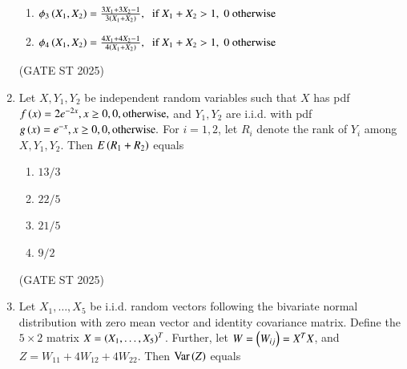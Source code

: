 \documentclass[journal,12pt,onecolumn]{IEEEtran}
\theoremstyle{remark}
\begin{document}
\begin{enumerate}
\begin{enumerate}
\item $\phi_3\left(X_1,X_2\right) = \frac{3X_1+3X_2-1}{3\left(X_1+X_2\right)}, \;\; \text{if } X_1+X_2>1, \; 0 \text{ otherwise}$
\item $\phi_4\left(X_1,X_2\right) = \frac{4X_1+4X_2-1}{4\left(X_1+X_2\right)}, \;\; \text{if } X_1+X_2>1, \; 0 \text{ otherwise}$
\end{enumerate}
\hfill{(GATE ST 2025)}
\item Let $X,Y_1,Y_2$ be independent random variables such that $X$ has pdf  
$
f\left(x\right) = 
2e^{-2x},  x \geq 0, \\
0,  \text{otherwise},
$
and $Y_1,Y_2$ are i.i.d. with pdf
$
g\left(x\right) = 
e^{-x},  x \geq 0, \\
0,  \text{otherwise}.
$
For $i=1,2$, let $R_i$ denote the rank of $Y_i$ among $X,Y_1,Y_2$. Then $E\left(R_1+R_2\right)$ equals
\begin{enumerate}
\item $13/3$
\item $22/5$
\item $21/5$
\item $9/2$
\end{enumerate}
\hfill{(GATE ST 2025)}
\item Let $X_1,\dots,X_5$ be i.i.d. random vectors following the bivariate normal distribution with zero mean vector and identity covariance matrix. Define the $5 \times 2$ matrix $X = \left(X_1,\dots,X_5\right)^T$. Further, let $W=\left(W_{ij}\right)=X^TX$, and $Z=W_{11}+4W_{12}+4W_{22}$. Then $\text{Var}\left(Z\right)$ equals


\end{enumerate}
\end{document}
